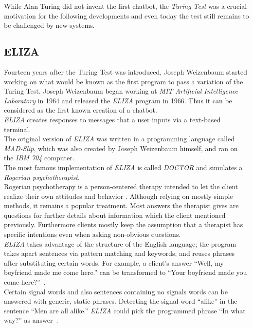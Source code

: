 While Alan Turing did not invent the first chatbot, the \emph{Turing Test} was a crucial motivation for the following developments
and even today the test still remains to be challenged by new systems.


\subsection{ELIZA}
\label{eliza}

Fourteen years after the Turing Test was introduced, Joseph Weizenbaum started working on what would be known as the first program to pass a variation of the Turing Test.
Joseph Weizenbaum began working at \emph{MIT Artificial Intelligence Laboratory} in 1964 and released the \emph{ELIZA} program in 1966.
Thus it can be considered as the first known creation of a chatbot.
\\

\emph{ELIZA} creates responses to messages that a user inputs via a text-based terminal.
\\

The original version of \emph{ELIZA} was written in a programming language called \emph{MAD-Slip},
which was also created by Joseph Weizenbaum himself, and ran on the \emph{IBM 704} computer.
\\

The most famous implementation of \emph{ELIZA} is called \emph{DOCTOR} and simulates a \emph{Rogerian psychotherapist}.
\\
Rogerian psychotherapy is a person-centered therapy intended to let the client realize their own attitudes and behavior \cite{rogerian}.
Although relying on mostly simple methods, it remains a popular treatment.
Most answers the therapist gives are questions for further details about information which the client mentioned previously.
Furthermore clients mostly keep the assumption that a therapist has specific intentions even when asking non-obvious questions.
\\

\emph{ELIZA} takes advantage of the structure of the English language;
the program takes apart sentences via pattern matching and keywords, and reuses phrases after substituting certain words.
For example, a client's answer ``Well, my boyfriend made me come here.'' can be transformed to ``Your boyfriend made you come here?''~\cite{elizatest}.
\\
Certain signal words and also sentences containing no signals words can be answered with generic, static phrases.
Detecting the signal word ``alike'' in the sentence ``Men are all alike.'' \emph{ELIZA} could pick the programmed phrase ``In what way?'' as answer~\cite{elizatest}.
\\

